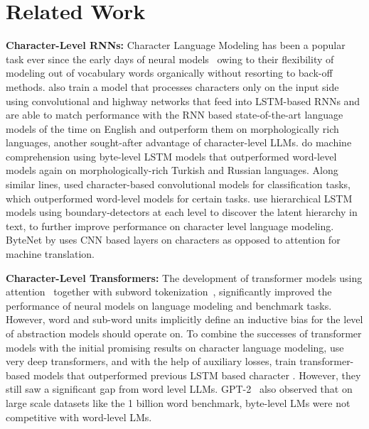 \documentclass[]{fairmeta}
\begin{document}
\section{Related Work}
\label{section:related_work}

\textbf{Character-Level RNNs:} Character Language Modeling has been a popular task ever since the early days of neural models~\citep{sutskever2011generating,mikolov2012subword,graves2013generating} owing to their flexibility of modeling out of vocabulary words organically without resorting to back-off methods. \cite{kim2016character} also train a model that processes characters only on the input side using convolutional and highway networks that feed into LSTM-based RNNs and are able to match performance with the RNN based state-of-the-art language models of the time on English and outperform them on morphologically rich languages, another sought-after advantage of character-level LLMs. \cite{kenter2018byte} do machine comprehension using byte-level LSTM models that outperformed word-level models again on morphologically-rich Turkish and Russian languages. Along similar lines, \cite{zhang2015character} used character-based convolutional models for classification tasks, which outperformed word-level models for certain tasks. \citet{chung2019hierarchical} use hierarchical LSTM models using boundary-detectors at each level to discover the latent hierarchy in text, to further improve performance on character level language modeling. ByteNet by \cite{kalchbrenner2016neural} uses CNN based layers on characters as opposed to attention for machine translation. 

\textbf{Character-Level Transformers:} The development of transformer models using attention~\citep{vaswani2017attention} together with subword tokenization~\citep{sennrich-etal-2016-neural}, significantly improved the performance of neural models on language modeling and benchmark tasks. However, word and sub-word units implicitly define an inductive bias for the level of abstraction models should operate on. To combine the successes of transformer models with the initial promising results on character language modeling, \citet{al2019character} use very deep transformers, and with the help of auxiliary losses, train transformer-based models that outperformed previous LSTM based character \llms{}. However, they still saw a significant gap from word level LLMs. GPT-2~\citep{radfordgpt2} also observed that on large scale datasets like the 1 billion word benchmark, byte-level LMs were not competitive with word-level LMs. 
\end{document}
